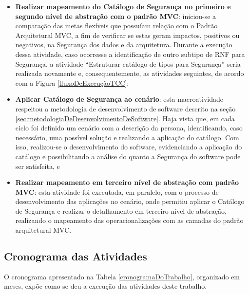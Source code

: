 \begin{itemize}
	\item \textbf{Realizar mapeamento do Catálogo de Segurança no primeiro e segundo nível de abstração com o padrão MVC}: iniciou-se a comparação das metas flexíveis que possuíam relação com o Padrão Arquitetural MVC, a fim de verificar se estas geram impactos, positivos ou negativos, na Segurança dos dados e da arquitetura. Durante a execução dessa atividade, caso ocorresse a identificação de outro subtipo de RNF para Segurança, a atividade “Estruturar catálogo de tipos para Segurança” seria realizada novamente e, consequentemente, as atividades seguintes, de acordo com a Figura \ref{fluxoDeExecuçãoTCC};
	
	\item \textbf{Aplicar Catálogo de Segurança ao cenário}: esta macroatividade respeitou a metodologia de desenvolvimento de software descrito na seção \ref{sec:metodologiaDeDesenvolvimentoDeSoftware}. Haja vista que, em cada ciclo foi definido um cenário com a descrição da persona, identificando, caso necessário, uma possível solução e realizando a aplicação do catálogo. Com isso, realizou-se o desenvolvimento do software, evidenciando a aplicação do catálogo e possibilitando a análise do quanto a Segurança do software pode ser satisfeita, e
	
	\item  \textbf{Realizar mapeamento em terceiro nível de abstração com padrão MVC}: esta atividade foi executada, em paralelo, com o processo de desenvolvimento das aplicações no cenário, onde permitiu aplicar o Catálogo de Segurança e realizar o detalhamento em terceiro nível de abstração, realizando o mapeamento das operacionalizações com as camadas do padrão arquitetural MVC. 
\end{itemize}


\subsection{Cronograma das Atividades}


O cronograma apresentado na Tabela \ref{cronogramaDoTrabalho}, organizado em meses, expõe como se deu a execução das atividades deste trabalho.

